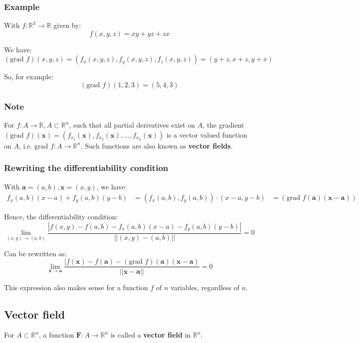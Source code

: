 \documentclass[11pt]{article}
\begin{document}
\subsubsection{Example}
\label{sec:org5b71ea0}
With \(f : \mathbb{R}^3 \rightarrow \mathbb{R}\) given by:
\[f(x, y, z) = xy + yz + zx\]

We have:
\[(\text{grad } f)(x, y, z) =(f_x(x, y, z), f_y(x, y, z), f_z(x, y, z)) = (y + z, x + z, y + x)\]

So, for example:
\[(\text{grad } f)(1, 2, 3) = (5, 4, 3)\]

\subsubsection{Note}
\label{sec:orge3d97bc}
For \(f : A \rightarrow \mathbb{R}, A \subset \mathbb{R}^n\), such that all partial derivatives exist on \(A\), the gradient \((\text{grad } f)(\boldsymbol{x}) = (f_{x_1}(\boldsymbol{x}),f_{x_2}(\boldsymbol{x}), \ldots, f_{x_n}(\boldsymbol{x}))\) is a vector valued function on \(A\), i.e. \(\text{grad } f : A \rightarrow \mathbb{R}^n\). Such functions are also known as \textbf{vector fields}.

\subsubsection{Rewriting the differentiability condition}
\label{sec:org855f228}
With \(\boldsymbol{a} = (a, b), \boldsymbol{x} = (x, y)\), we have:
\begin{align*}
f_x(a, b)(x - a) + f_y (a, b) (y - b) &= (f_x(a, b), f_y(a, b)) \cdot (x - a, y - b)
&= (\text{grad } f (\boldsymbol{a}) (\boldsymbol{x} - \boldsymbol{a}))
\end{align*}

Hence, the differentiability condition:
\[\lim_{(x, y) \rightarrow (a, b)} \frac{|f(x, y) - f(a, b) - f_x(a, b) (x - a) - f_y (a, b) (y - b)|}{||(x, y) -(a, b)||} = 0\]

Can be rewritten as:
\[\lim_{\boldsymbol{x} \rightarrow \boldsymbol{a}} \frac{|f(\boldsymbol{x}) - f(\boldsymbol{a}) - (\text{grad } f)(\boldsymbol{a}) (\boldsymbol{x} - \boldsymbol{a})}{||\boldsymbol{x} - \boldsymbol{a}||} = 0\]

This expression also makes sense for a function \(f\) of \(n\) variables, regardless of \(n\).

\subsection{Vector field}
\label{sec:org2250853}
For \(A \subset \mathbb{R}^n\), a function \(\boldsymbol{F} : A \rightarrow \mathbb{R}^n\) is called a \textbf{vector field} in \(\mathbb{R}^n\).
\end{document}
